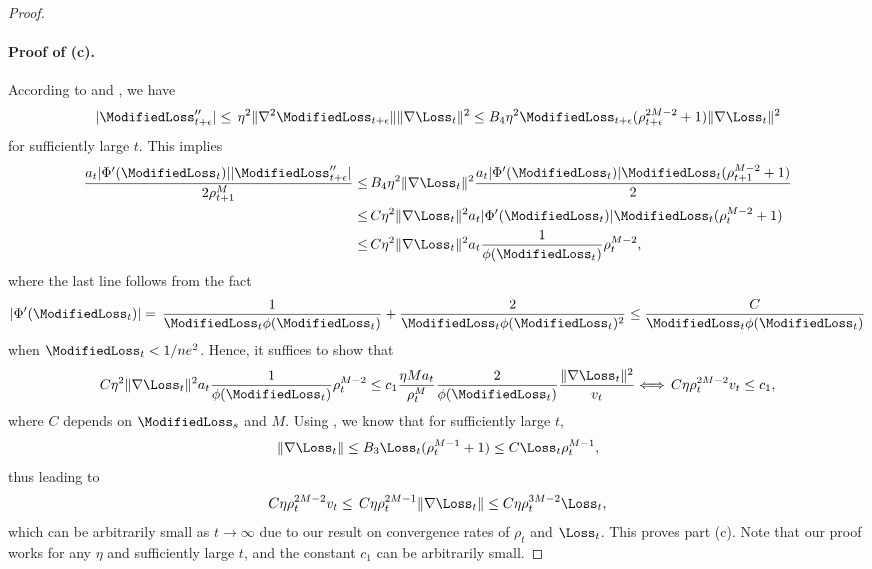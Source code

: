 \begin{proof}
\paragraph{Proof of (c).} 
According to  and , we have
\begin{equation*}
    \vert \ModifiedLoss_{t + \epsilon}'' \vert \le \, \eta^2 \| \nabla^2 \ModifiedLoss_{t+\epsilon} \| \| \nabla \Loss_t \|^2 \le B_4 \eta^2 \ModifiedLoss_{t+\epsilon} (\rho_{t+\epsilon}^{2M-2} + 1) \| \nabla \Loss_t \|^2
\end{equation*}
for sufficiently large $t$. This implies
\begin{align*}
    \frac{a_t \vert \Phi'(\ModifiedLoss_t) \vert \vert \ModifiedLoss_{t + \epsilon}'' \vert }{2 \rho_{t+1}^M} \le \, & B_4 \eta^2 \| \nabla \Loss_t \|^2 \frac{a_t \vert \Phi'(\ModifiedLoss_t) \vert \ModifiedLoss_t (\rho_{t+1}^{M-2} + 1)}{2} \\
    \le \, & C \eta^2 \| \nabla \Loss_t \|^2 a_t \vert \Phi'(\ModifiedLoss_t) \vert \ModifiedLoss_t (\rho_t^{M-2}+1) \\
    \le \, & C \eta^2 \| \nabla \Loss_t \|^2 a_t \frac{1}{\phi(\ModifiedLoss_t)} \rho_t^{M-2},
\end{align*}
where the last line follows from the fact
\begin{equation*}
    \left\vert \Phi'(\ModifiedLoss_t) \right\vert = \, \frac{1}{\ModifiedLoss_t \phi(\ModifiedLoss_t)} + \frac{2}{\ModifiedLoss_t \phi(\ModifiedLoss_t)^2} \le \frac{C}{\ModifiedLoss_t \phi(\ModifiedLoss_t)}
\end{equation*}
when $\ModifiedLoss_t < 1/ne^2$.
Hence, it suffices to show that
\begin{align*}
    C \eta^2 \| \nabla \Loss_t \|^2 a_t \frac{1}{\phi(\ModifiedLoss_t)} \rho_t^{M-2} \le c_1 \frac{\eta M a_t}{\rho_t^{M}} \frac{2}{\phi(\ModifiedLoss_t)} \frac{\| \nabla \Loss_t \|^2}{v_t}
    \Longleftrightarrow \, C \eta \rho_t^{2M-2} v_t \le c_1,
\end{align*}
where $C$ depends on $\ModifiedLoss_s$ and $M$. Using , we know that for sufficiently large $t$,
\begin{equation*}
    \| \nabla \Loss_t \| \le B_3 \Loss_t (\rho_t^{M-1} + 1) \le C \Loss_t \rho_t^{M-1},
\end{equation*}
thus leading to
\begin{align*}
    C \eta \rho_t^{2M-2} v_t \le \, C \eta \rho_t^{2M-1} \| \nabla \Loss_t \| \le C \eta \rho_t^{3M-2} \Loss_t,
\end{align*}
which can be arbitrarily small as $t \to \infty$ due to our result on convergence rates of $\rho_t$ and $\Loss_t$. This proves part (c). Note that our proof works for any $\eta$ and sufficiently large $t$, and the constant $c_1$ can be arbitrarily small.


\end{proof}
